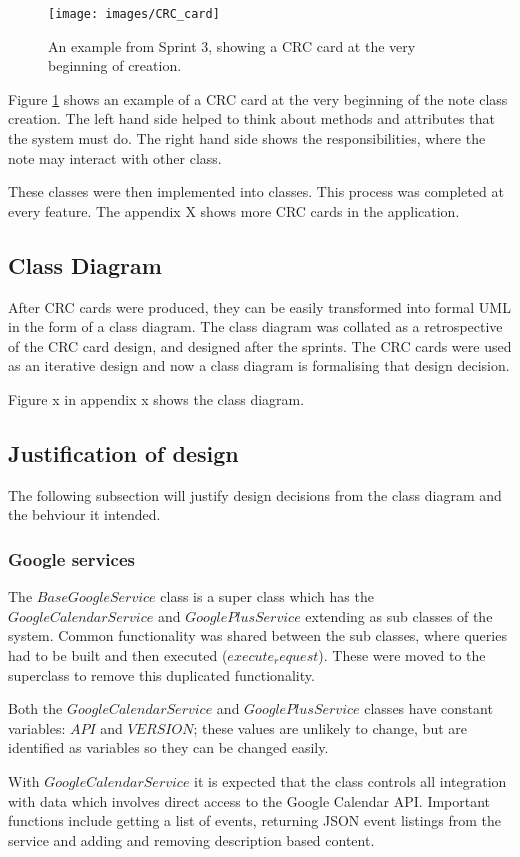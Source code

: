 \begin{figure}[h]
  \centering
  \texttt{[image: images/CRC\_card]}
  \caption{An example from Sprint 3, showing a CRC card at the very beginning of creation.}
  \label{fig:crc1}
\end{figure}

Figure \ref{fig:crc1} shows an example of a CRC card at the very beginning of the note class creation. The left hand side helped to think about methods and attributes that the system must do. The right hand side shows the responsibilities, where the note may interact with other class.

These classes were then implemented into classes. This process was completed at every feature. The appendix X shows more CRC cards in the application.
\subsection{Class Diagram}
After CRC cards were produced, they can be easily transformed into formal UML in the form of a class diagram. The class diagram was collated as a retrospective of the CRC card design, and designed after the sprints. The CRC cards were used as an iterative design and now a class diagram is formalising that design decision.

Figure x in appendix x shows the class diagram.

\subsection{Justification of design}
The following subsection will justify design decisions from the class diagram and the behviour it intended.
\subsubsection{Google services}
The $BaseGoogleService$ class is a super class which has the $GoogleCalendarService$ and $GooglePlusService$ extending as sub classes of the system. Common functionality was shared between the sub classes, where queries had to be built and then executed ($execute_request$). These were moved to the superclass to remove this duplicated functionality.

Both the $GoogleCalendarService$ and $GooglePlusService$ classes have constant variables: $API$ and $VERSION$; these values are unlikely to change, but are identified as variables so they can be changed easily.

With $GoogleCalendarService$ it is expected that the class controls all integration with data which involves direct access to the Google Calendar API. Important functions include getting a list of events, returning JSON event listings from the service and adding and removing description based content.

